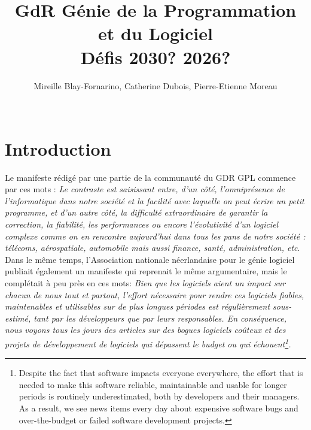 \documentclass[11pt]{article}
\title{GdR Génie de la Programmation et du Logiciel\\ 
Défis 2030? 2026?}
\author{Mireille Blay-Fornarino, Catherine Dubois, Pierre-Etienne Moreau\\
\\
}
\begin{document}
\maketitle

\section{Introduction}

Le manifeste rédigé par une partie de la communauté du GDR GPL commence par ces mots : \emph{Le contraste est saisissant entre, d’un côté, l’omniprésence de l’informatique dans notre
société et la facilité avec laquelle on peut écrire un petit programme, et d’un autre côté, la difficulté extraordinaire de garantir la correction, la fiabilité, les performances ou encore
l’évolutivité d’un logiciel complexe comme on en rencontre aujourd’hui dans tous les pans
de notre société : télécoms, aérospatiale, automobile mais aussi finance, santé,
administration, etc}\cite{Manifeste}.
Dans le même temps, l'Association nationale néerlandaise pour le génie logiciel publiait également un manifeste \cite{Nederland2019} qui reprenait le même argumentaire, mais le complétait à peu près en ces mots:  \emph{Bien que les logiciels aient un impact sur chacun de nous tout et partout, l'effort nécessaire pour rendre ces logiciels fiables, maintenables et utilisables sur de plus longues périodes est régulièrement sous-estimé, tant par les développeurs que par leurs responsables. En conséquence, nous voyons tous les jours des articles sur des bogues logiciels coûteux et des projets de développement de logiciels qui dépassent le budget ou qui échouent\footnote{Despite the fact that software impacts everyone everywhere, the effort that is needed to make this software reliable,
maintainable and usable for longer periods is routinely underestimated, both by developers and their managers. As a result,
we see news items every day about expensive software bugs and over-the-budget or failed software development projects\cite{Nederland2019}.}.}
\end{document}
